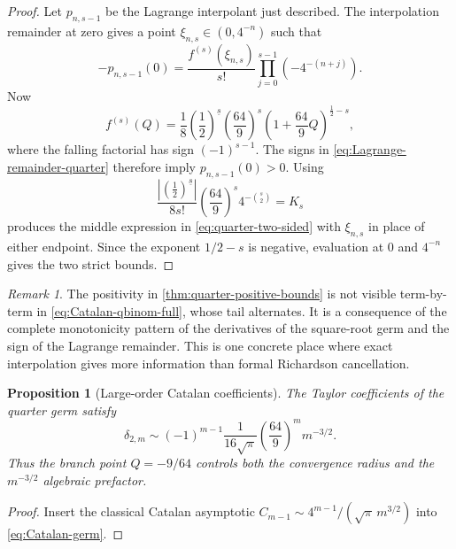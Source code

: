 \documentclass[11pt,oneside]{article}
\numberwithin{equation}{section}
\newtheorem{proposition}[theorem]{Proposition}
\theoremstyle{definition}
\theoremstyle{remark}
\newtheorem{remark}[theorem]{Remark}
\begin{document}
\begin{proof}
Let $p_{n,s-1}$ be the Lagrange interpolant just described.  The interpolation
remainder at zero gives a point $\xi_{n,s}\in(0,4^{-n})$ such that
\begin{equation}
 -p_{n,s-1}(0)
 =\frac{f^{(s)}(\xi_{n,s})}{s!}
   \prod_{j=0}^{s-1}(-4^{-(n+j)}).
 \label{eq:Lagrange-remainder-quarter}
\end{equation}
Now
\begin{equation}
 f^{(s)}(Q)=\frac1{8}\left(\frac12\right)^{\!\underline{s}}
 \left(\frac{64}{9}\right)^s
 \left(1+\frac{64}{9}Q\right)^{\frac12-s},
 \label{eq:f-quarter-derivative}
\end{equation}
where the falling factorial has sign $(-1)^{s-1}$.  The signs in
\eqref{eq:Lagrange-remainder-quarter} therefore imply $p_{n,s-1}(0)>0$.
Using
\begin{equation}
 \frac{\left|\left(\frac12\right)^{\!\underline{s}}\right|}{8s!}
 \left(\frac{64}{9}\right)^s4^{-\binom s2}=K_s
 \label{eq:Ks-identity}
\end{equation}
produces the middle expression in \eqref{eq:quarter-two-sided} with
$\xi_{n,s}$ in place of either endpoint.  Since the exponent $1/2-s$ is
negative, evaluation at $0$ and $4^{-n}$ gives the two strict bounds.
\end{proof}

\begin{remark}
The positivity in \cref{thm:quarter-positive-bounds} is not visible term-by-term in
\eqref{eq:Catalan-qbinom-full}, whose tail alternates.  It is a consequence of the
complete monotonicity pattern of the derivatives of the square-root germ and the sign
of the Lagrange remainder.  This is one concrete place where exact interpolation gives
more information than formal Richardson cancellation.
\end{remark}

\begin{proposition}[Large-order Catalan coefficients]
\label{prop:Catalan-large-order}
The Taylor coefficients of the quarter germ satisfy
\begin{equation}
 \boxed{
 \delta_{2,m}\sim
 (-1)^{m-1}\frac1{16\sqrt\pi}\left(\frac{64}{9}\right)^m m^{-3/2}.}
 \label{eq:Catalan-large-order}
\end{equation}
Thus the branch point $Q=-9/64$ controls both the convergence radius and the
$m^{-3/2}$ algebraic prefactor.
\end{proposition}

\begin{proof}
Insert the classical Catalan asymptotic
$C_{m-1}\sim4^{m-1}/(\sqrt\pi\,m^{3/2})$ into
\eqref{eq:Catalan-germ}.
\end{proof}
\end{document}
